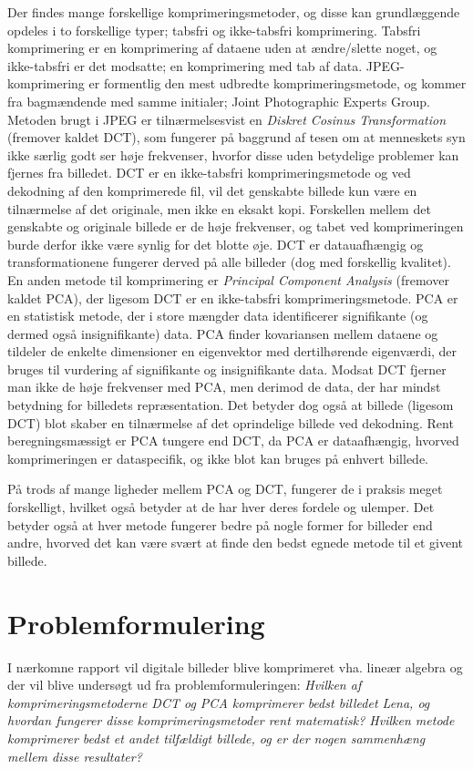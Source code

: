 Der findes mange forskellige komprimeringsmetoder, og disse kan grundlæggende opdeles i to forskellige typer; tabsfri og ikke-tabsfri komprimering. Tabsfri komprimering er en komprimering af dataene uden at ændre/slette noget, og ikke-tabsfri er det modsatte; en komprimering med tab af data.
JPEG-komprimering er formentlig den mest udbredte komprimeringsmetode, og kommer fra bagmændende med samme initialer; Joint Photographic Experts Group. Metoden brugt i JPEG er tilnærmelsesvist en \emph{Diskret Cosinus Transformation} (fremover kaldet DCT), som fungerer på baggrund af tesen om at menneskets syn ikke særlig godt ser høje frekvenser, hvorfor disse uden betydelige problemer kan fjernes fra billedet. DCT er en ikke-tabsfri komprimeringsmetode og ved dekodning af den komprimerede fil, vil det genskabte billede kun være en tilnærmelse af det originale, men ikke en eksakt kopi. Forskellen mellem det genskabte og originale billede er de høje frekvenser, og tabet ved komprimeringen burde derfor ikke være synlig for det blotte øje. DCT er datauafhængig og transformationene fungerer derved på alle billeder (dog med forskellig kvalitet).
En anden metode til komprimering er \emph{Principal Component Analysis} (fremover kaldet PCA), der ligesom DCT er en ikke-tabsfri komprimeringsmetode. PCA er en statistisk metode, der i store mængder data identificerer signifikante (og dermed også insignifikante) data. PCA finder kovariansen mellem dataene og tildeler de enkelte dimensioner en eigenvektor med dertilhørende eigenværdi, der bruges til vurdering af signifikante og insignifikante data. Modsat DCT fjerner man ikke de høje frekvenser med PCA, men derimod de data, der har mindst betydning for billedets repræsentation. Det betyder dog også at billede (ligesom DCT) blot skaber en tilnærmelse af det oprindelige billede ved dekodning. Rent beregningsmæssigt er PCA tungere end DCT, da PCA er dataafhængig, hvorved komprimeringen er dataspecifik, og ikke blot kan bruges på enhvert billede.

På trods af mange ligheder mellem PCA og DCT, fungerer de i praksis meget forskelligt, hvilket også betyder at de har hver deres fordele og ulemper. Det betyder også at hver metode fungerer bedre på nogle former for billeder end andre, hvorved det kan være svært at finde den bedst egnede metode til et givent billede.


\section{Problemformulering}
I nærkomne rapport vil digitale billeder blive komprimeret vha. lineær algebra og der vil blive undersøgt ud fra problemformuleringen:
\emph{Hvilken af komprimeringsmetoderne DCT og PCA komprimerer bedst billedet Lena, og hvordan fungerer disse komprimeringsmetoder rent matematisk? Hvilken metode komprimerer bedst et andet tilfældigt billede, og er der nogen sammenhæng mellem disse resultater?}

